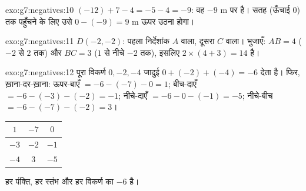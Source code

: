 \begin{solution}{exo:g7:negatives:10}
$(-12) + 7 - 4 = -5 - 4 = -9$: वह $-9$ m पर है। सतह (ऊँचाई $0$)
तक पहुँचने के लिए उसे $0 - (-9) = 9$ m ऊपर उठना होगा।
\end{solution}

\begin{solution}{exo:g7:negatives:11}
$D(-2, -2)$: पहला निर्देशांक $A$ वाला, दूसरा $C$ वाला। भुजाएँ:
$AB = 4$ ($-2$ से $2$ तक) और $BC = 3$ ($1$ से नीचे $-2$ तक),
इसलिए  $2 \times (4 + 3) = 14$ है।
\end{solution}

\begin{solution}{exo:g7:negatives:12}
पूरा विकर्ण $0, -2, -4$ जादुई 
$0 + (-2) + (-4) = -6$ देता है। फिर, ख़ाना-दर-ख़ाना:
ऊपर-बाएँ $= -6 - (-7) - 0 = 1$; बीच-दाएँ $= -6 - (-3) - (-2) =
-1$; नीचे-दाएँ $= -6 - 0 - (-1) = -5$; नीचे-बीच
$= -6 - (-7) - (-2) = 3$।
\begin{center}
\renewcommand{\arraystretch}{1.4}
\begin{tabular}{|c|c|c|}
\hline
$1$ & $-7$ & $0$ \\
\hline
$-3$ & $-2$ & $-1$ \\
\hline
$-4$ & $3$ & $-5$ \\
\hline
\end{tabular}
\end{center}
हर पंक्ति, हर स्तंभ और हर विकर्ण का  $-6$ है।
\end{solution}

